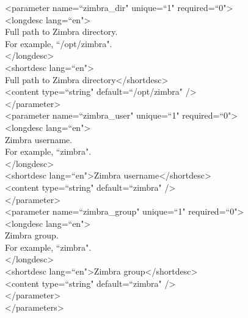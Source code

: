 \documentclass[a4paper, 12pt]{book}
\begin{document}
\noindent \textless parameter name=``zimbra\_dir" unique=``1" required=``0"\textgreater\\
\textless longdesc lang=``en"\textgreater\\
Full path to Zimbra directory.\\
For example, ``/opt/zimbra".\\
\textless /longdesc\textgreater\\
\textless shortdesc lang=``en"\textgreater\\
Full path to Zimbra directory\textless /shortdesc\textgreater\\
\textless content type=``string" default=``/opt/zimbra" /\textgreater\\
\textless /parameter\textgreater\\

\noindent \textless parameter name=``zimbra\_user" unique=``1" required=``0"\textgreater\\
\textless longdesc lang=``en"\textgreater\\
Zimbra username.\\
For example, ``zimbra".\\
\textless /longdesc\textgreater\\
\textless shortdesc lang=``en"\textgreater Zimbra username\textless /shortdesc\textgreater\\
\textless content type=``string" default=``zimbra" /\textgreater\\
\textless /parameter\textgreater\\

\noindent \textless parameter name=``zimbra\_group" unique=``1" required=``0"\textgreater\\
\textless longdesc lang=``en"\textgreater\\
Zimbra group.\\
For example, ``zimbra".\\
\textless /longdesc\textgreater\\
\textless shortdesc lang=``en"\textgreater Zimbra group\textless /shortdesc\textgreater\\
\textless content type=``string" default=``zimbra" /\textgreater\\
\textless /parameter\textgreater\\

\noindent \textless /parameters\textgreater\\
\end{document}
